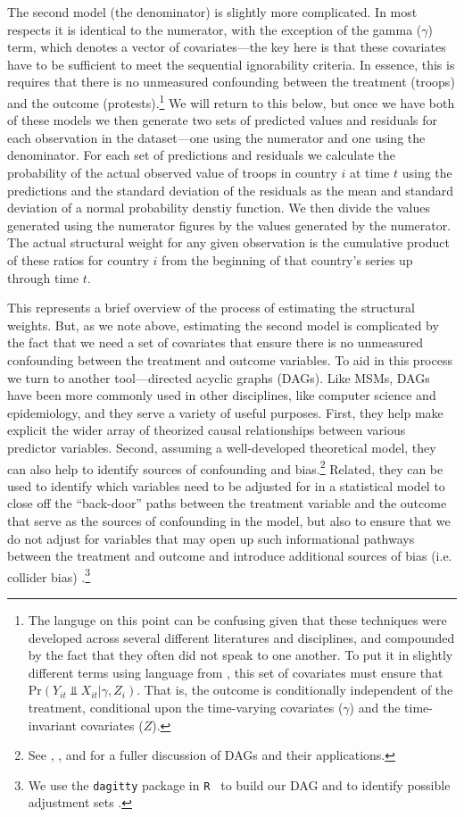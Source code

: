 The second model (the denominator) is slightly more complicated. In most respects it is identical to the numerator, with the exception of the gamma ($\gamma$) term, which denotes a vector of covariates---the key here is that these covariates have to be sufficient to meet the sequential ignorability criteria. In essence, this is requires that there is no unmeasured confounding between the treatment (troops) and the outcome (protests).\footnote{The languge on this point can be confusing given that these techniques were developed across several different literatures and disciplines, and compounded by the fact that they often did not speak to one another. To put it in slightly different terms using language from , this set of covariates must ensure that Pr$(Y_{it} \Perp X_{it} | \gamma, Z_{i})$. That is, the outcome is conditionally independent of the treatment, conditional upon the time-varying covariates ($\gamma$) and the time-invariant covariates ($Z$).} We will return to this below, but once we have both of these models we then generate two sets of predicted values and residuals for each observation in the dataset---one using the numerator and one using the denominator. For each set of predictions and residuals we calculate the probability of the actual observed value of troops in country $i$ at time $t$ using the predictions and the standard deviation of the residuals as the mean and standard deviation of a normal probability denstiy function. We then divide the values generated using the numerator figures by the values generated by the numerator. The actual structural weight for any given observation is the cumulative product of these ratios for country $i$ from the beginning of that country's series up through time $t$. 

This represents a brief overview of the process of estimating the structural weights. But, as we note above, estimating the second model is complicated by the fact that we need a set of covariates that ensure there is no unmeasured confounding between the treatment and outcome variables. To aid in this process we turn to another tool---directed acyclic graphs (DAGs). Like MSMs, DAGs have been more commonly used in other disciplines, like computer science and epidemiology, and they serve a variety of useful purposes. First, they help make explicit the wider array of theorized causal relationships between various predictor variables. Second, assuming a well-developed theoretical model, they can also help to identify sources of confounding and bias.\footnote{See , , and  for a fuller discussion of DAGs and their applications.} Related, they can be used to identify which variables need to be adjusted for in a statistical model to close off the ``back-door'' paths between the treatment variable and the outcome that serve as the sources of confounding in the model, but also to ensure that we do not adjust for variables that may open up such informational pathways between the treatment and outcome and introduce additional sources of bias (i.e. collider bias) \cite{Pearl2009}.\footnote{We use the {\tt dagitty} package in {\tt R } to build our DAG and to identify possible adjustment sets \cite{Textoretal2016}.}


